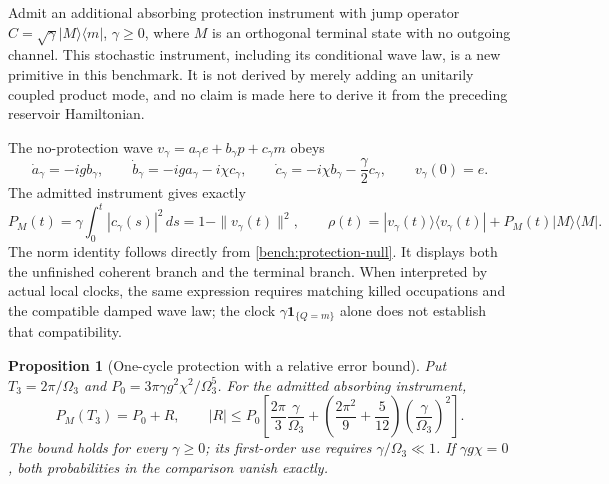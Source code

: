 \documentclass[11pt,oneside,openany]{book}
\newtheorem{proposition}[theorem]{Proposition}
\theoremstyle{definition}
\theoremstyle{remark}\newtheorem{remark}[theorem]{Remark}
\begin{document}
Admit an additional absorbing protection instrument with jump operator
$C=\sqrt\gamma|M\rangle\langle m|$, $\gamma\ge0$, where $M$ is an
orthogonal terminal state with no outgoing channel. This stochastic
instrument, including its conditional wave law, is a new primitive in
this benchmark. It is not derived by merely adding an unitarily coupled
product mode, and no claim is made here to derive it from the preceding
reservoir Hamiltonian.

The no-protection wave $v_\gamma=a_\gamma e+b_\gamma p+c_\gamma m$
obeys
\begin{equation}
 \dot a_\gamma=-igb_\gamma,\qquad
 \dot b_\gamma=-iga_\gamma-i\chi c_\gamma,\qquad
 \dot c_\gamma=-i\chi b_\gamma-\frac\gamma2c_\gamma,
 \qquad v_\gamma(0)=e.
 \label{bench:protection-null}
\end{equation}
The admitted instrument gives exactly
\begin{equation}
 P_M(t)=\gamma\int_0^t|c_\gamma(s)|^2\,ds
       =1-\|v_\gamma(t)\|^2,
 \qquad
 \rho(t)=|v_\gamma(t)\rangle\langle v_\gamma(t)|
                          +P_M(t)|M\rangle\langle M|.
 \label{bench:protection-exact}
\end{equation}
The norm identity follows directly from
\eqref{bench:protection-null}. It displays both the unfinished coherent
branch and the terminal branch. When interpreted by actual local clocks,
the same expression requires matching killed occupations and the
compatible damped wave law; the clock $\gamma\mathbf1_{\{Q=m\}}$
alone does not establish that compatibility.

\begin{proposition}[One-cycle protection with a relative error bound]
\label{bench:protection-bound}
Put $T_3=2\pi/\Omega_3$ and
$P_0=3\pi\gamma g^2\chi^2/\Omega_3^5$. For the admitted absorbing
instrument,
\begin{equation}
 P_M(T_3)=P_0+R,\qquad
 |R|\le P_0\left[
  \frac{2\pi}{3}\frac\gamma{\Omega_3}
  +\left(\frac{2\pi^2}{9}+\frac5{12}\right)
                        \left(\frac\gamma{\Omega_3}\right)^2\right].
 \label{bench:protection-relative}
\end{equation}
The bound holds for every $\gamma\ge0$; its first-order use requires
$\gamma/\Omega_3\ll1$. If $\gamma g\chi=0$, both probabilities in
the comparison vanish exactly.
\end{proposition}
\end{document}
